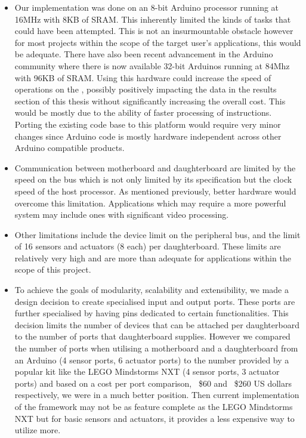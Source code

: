 \begin{itemize}
\item Our implementation was done on an 8-bit Arduino processor running at 16MHz with 8KB of SRAM. This inherently limited the kinds of tasks that could have been attempted. This is not an insurmountable obstacle however for most projects within the scope of the target user's applications, this would be adequate. There have also been recent advancement in the Arduino community where there is now available 32-bit Arduinos running at 84Mhz with 96KB of SRAM. Using this hardware could increase the speed of operations on the \xten, possibly positively impacting the data in the results section of this thesis without significantly increasing the overall cost. This would be mostly due to the ability of faster processing of instructions. Porting the existing code base to this platform would require very minor changes since Arduino code is mostly hardware independent across other Arduino compatible products.

\item Communication between motherboard and daughterboard are limited by the speed on the \iic bus which is not only limited by its specification but the clock speed of the host processor. As mentioned previously, better hardware would overcome this limitation. Applications which may require a more powerful system may include ones with significant video processing.
\item Other limitations include the  device limit on the peripheral bus, and the limit of 16 sensors and actuators (8 each) per daughterboard. These limits are relatively very high and are more than adequate for applications within the scope of this project.
\item To achieve the goals of modularity, scalability and extensibility, we made a design decision to create specialised input and output ports. These ports are further specialised by having pins dedicated to certain functionalities. This decision limits the number of devices that can be attached per daughterboard to the number of ports that daughterboard supplies. However we compared the number of ports when utilising a motherboard and a daughterboard from an Arduino (4 sensor ports, 6 actuator ports) to the number provided by a popular kit like the LEGO Mindstorms NXT (4 sensor ports, 3 actuator ports) and based on a cost per port comparison, ~\$60 and ~\$260 US dollars respectively, we were in a much better position. Then current implementation of the \xten framework may not be as feature complete as the LEGO Mindstorms NXT but for basic sensors and actuators, it provides a less expensive way to utilize more.
\end{itemize}

